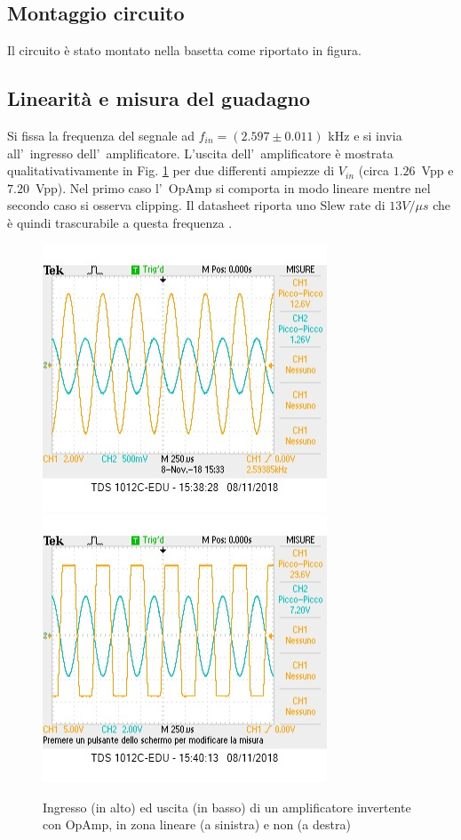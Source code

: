 \documentclass[10pt,a4paper]{article}
\begin{document}
	\subsection{Montaggio circuito}
	Il circuito è stato montato nella basetta come riportato in figura.
	\subsection{Linearit\`a e misura del guadagno}
	Si fissa la frequenza del segnale ad $f_{in} = (2.597 \pm 0.011)$ kHz e si invia all'~ingresso dell'~amplificatore.	L'uscita dell'~amplificatore \`e mostrata qualitativativamente in Fig. \ref{fig:oscinv} per due 
	differenti ampiezze di $V_{in}$ (circa $1.26$~Vpp e $7.20$~Vpp). 
	Nel primo caso l'~OpAmp si comporta in modo lineare mentre nel secondo caso si osserva clipping. Il datasheet riporta uno Slew rate di $13 V/\mu s$ che è quindi trascurabile a questa frequenza .
	\begin{figure}[h]
		\begin{center}
		
			\includegraphics[scale=0.7]{foto1.jpg}
			\includegraphics[scale=0.7]{foto2.jpg}
			\caption{screenshot dei segnali con e senza clipping}
		\end{center}
		\caption{\small Ingresso (in alto) ed uscita (in basso) di un amplificatore invertente con OpAmp, in 
			zona lineare (a sinistra) e non (a destra)}
		\label{fig:oscinv}
	\end{figure}
	
\end{document}
